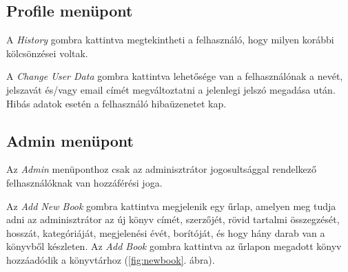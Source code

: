 \subsection{Profile menüpont}

A \textit{History} gombra kattintva megtekintheti a felhasználó, hogy milyen korábbi kölcsönzései voltak.

A \textit{Change User Data} gombra kattintva lehetősége van a felhasználónak a nevét, jelszavát és/vagy email címét megváltoztatni a jelenlegi jelszó megadása után. Hibás adatok esetén a felhasználó hibaüzenetet kap.

\subsection{Admin menüpont}

Az \textit{Admin} menüponthoz csak az adminisztrátor jogosultsággal rendelkező felhasználóknak van hozzáférési joga. 

Az \textit{Add New Book} gombra kattintva megjelenik egy űrlap, amelyen meg tudja adni az adminisztrátor az új könyv címét, szerzőjét, rövid tartalmi összegzését, hosszát, kategóriáját, megjelenési évét, borítóját, és hogy hány darab van a könyvből készleten. Az \textit{Add Book} gombra kattintva az űrlapon megadott könyv hozzáadódik a könyvtárhoz (\ref{fig:newbook}. ábra).

